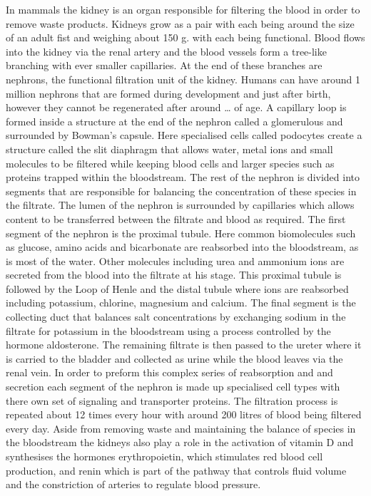 \documentclass[11pt,a4paper,titlepage,twoside,openright]{style/unimelbthesis}
\theoremstyle{definition}
\theoremstyle{definition}
\theoremstyle{definition}
\theoremstyle{remark}
\begin{document}
\begin{mainmatter}
In mammals the kidney is an organ responsible for filtering the blood in order to remove waste products. Kidneys grow as a pair with each being around the size of an adult fist and weighing about 150 g. with each being functional. Blood flows into the kidney via the renal artery and the blood vessels form a tree-like branching with ever smaller capillaries. At the end of these branches are nephrons, the functional filtration unit of the kidney. Humans can have around 1 million nephrons that are formed during development and just after birth, however they cannot be regenerated after around \ldots{} of age. A capillary loop is formed inside a structure at the end of the nephron called a glomerulous and surrounded by Bowman's capsule. Here specialised cells called podocytes create a structure called the slit diaphragm that allows water, metal ions and small molecules to be filtered while keeping blood cells and larger species such as proteins trapped within the bloodstream. The rest of the nephron is divided into segments that are responsible for balancing the concentration of these species in the filtrate. The lumen of the nephron is surrounded by capillaries which allows content to be transferred between the filtrate and blood as required. The first segment of the nephron is the proximal tubule. Here common biomolecules such as glucose, amino acids and bicarbonate are reabsorbed into the bloodstream, as is most of the water. Other molecules including urea and ammonium ions are secreted from the blood into the filtrate at his stage. This proximal tubule is followed by the Loop of Henle and the distal tubule where ions are reabsorbed including potassium, chlorine, magnesium and calcium. The final segment is the collecting duct that balances salt concentrations by exchanging sodium in the filtrate for potassium in the bloodstream using a process controlled by the hormone aldosterone. The remaining filtrate is then passed to the ureter where it is carried to the bladder and collected as urine while the blood leaves via the renal vein. In order to preform this complex series of reabsorption and and secretion each segment of the nephron is made up specialised cell types with there own set of signaling and transporter proteins. The filtration process is repeated about 12 times every hour with around 200 litres of blood being filtered every day. Aside from removing waste and maintaining the balance of species in the bloodstream the kidneys also play a role in the activation of vitamin D and synthesises the hormones erythropoietin, which stimulates red blood cell production, and renin which is part of the pathway that controls fluid volume and the constriction of arteries to regulate blood pressure.


\end{mainmatter}
\end{document}
